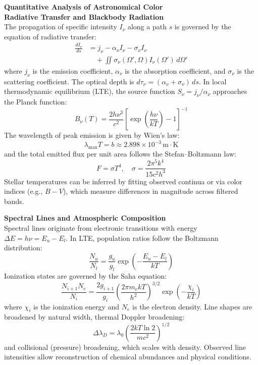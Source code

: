 \begin{technical}
{\Large\textbf{Quantitative Analysis of Astronomical Color}}\\[0.3em]


\noindent\textbf{Radiative Transfer and Blackbody Radiation}\\[0.2em]
The propagation of specific intensity \( I_\nu \) along a path \( s \) is governed by the equation of radiative transfer:
\begin{align*}
\frac{dI_\nu}{ds} &= j_\nu - \alpha_\nu I_\nu - \sigma_\nu I_\nu \\
&\quad + \iint \sigma_\nu(\Omega', \Omega) I_\nu(\Omega')\, d\Omega'
\end{align*}
where \( j_\nu \) is the emission coefficient, \( \alpha_\nu \) is the absorption coefficient, and \( \sigma_\nu \) is the scattering coefficient. The optical depth is \( d\tau_\nu = (\alpha_\nu + \sigma_\nu)\, ds \). In local thermodynamic equilibrium (LTE), the source function \( S_\nu = j_\nu/\alpha_\nu \) approaches the Planck function:
\[
B_\nu(T) = \frac{2h\nu^3}{c^2} \left[ \exp\left( \frac{h\nu}{kT} \right) - 1 \right]^{-1}
\]
The wavelength of peak emission is given by Wien's law:
\[
\lambda_{\text{max}} T = b \approx 2.898 \times 10^{-3} \, \text{m} \cdot \text{K}
\]
and the total emitted flux per unit area follows the Stefan--Boltzmann law:
\[
F = \sigma T^4, \quad \sigma = \frac{2\pi^5 k^4}{15c^2 h^3}
\]
Stellar temperatures can be inferred by fitting observed continua or via color indices (e.g., \( B-V \)), which measure differences in magnitude across filtered bands.

\noindent\textbf{Spectral Lines and Atmospheric Composition}\\[0.2em]
Spectral lines originate from electronic transitions with energy \( \Delta E = h\nu = E_u - E_l \). In LTE, population ratios follow the Boltzmann distribution:
\[
\frac{N_u}{N_l} = \frac{g_u}{g_l} \exp\left( -\frac{E_u - E_l}{kT} \right)
\]
Ionization states are governed by the Saha equation:
\[
\frac{N_{i+1} N_e}{N_i} = \frac{2 g_{i+1}}{g_i} \left( \frac{2\pi m_e kT}{h^2} \right)^{3/2} \exp\left( -\frac{\chi_i}{kT} \right)
\]
where \( \chi_i \) is the ionization energy and \( N_e \) is the electron density. Line shapes are broadened by natural width, thermal Doppler broadening:
\[
\Delta \lambda_D = \lambda_0 \left( \frac{2kT \ln 2}{mc^2} \right)^{1/2}
\]
and collisional (pressure) broadening, which scales with density. Observed line intensities allow reconstruction of chemical abundances and physical conditions.


\end{technical}
